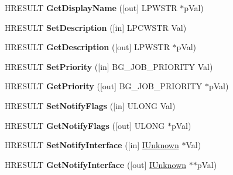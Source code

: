 \begin{DoxyCompactItemize}
H\+R\+E\+S\+U\+LT {\bfseries Get\+Display\+Name} (\mbox{[}out\mbox{]} L\+P\+W\+S\+TR $\ast$p\+Val)
\item 
\mbox{\label{interface_i_background_copy_job_aff86ae5411bd7cec30f2c811a20e73bf}} 
H\+R\+E\+S\+U\+LT {\bfseries Set\+Description} (\mbox{[}in\mbox{]} L\+P\+C\+W\+S\+TR Val)
\item 
\mbox{\label{interface_i_background_copy_job_aa79948c7648f7cd02f9742f31ec1b811}} 
H\+R\+E\+S\+U\+LT {\bfseries Get\+Description} (\mbox{[}out\mbox{]} L\+P\+W\+S\+TR $\ast$p\+Val)
\item 
\mbox{\label{interface_i_background_copy_job_a71f943c5e1dabadc5584926f58f96d3e}} 
H\+R\+E\+S\+U\+LT {\bfseries Set\+Priority} (\mbox{[}in\mbox{]} B\+G\+\_\+\+J\+O\+B\+\_\+\+P\+R\+I\+O\+R\+I\+TY Val)
\item 
\mbox{\label{interface_i_background_copy_job_a1216711ef1b3aa46c85d73c4943e1e49}} 
H\+R\+E\+S\+U\+LT {\bfseries Get\+Priority} (\mbox{[}out\mbox{]} B\+G\+\_\+\+J\+O\+B\+\_\+\+P\+R\+I\+O\+R\+I\+TY $\ast$p\+Val)
\item 
\mbox{\label{interface_i_background_copy_job_a1f634ff9f88d9eeeb2cf8e4dcb16900f}} 
H\+R\+E\+S\+U\+LT {\bfseries Set\+Notify\+Flags} (\mbox{[}in\mbox{]} U\+L\+O\+NG Val)
\item 
\mbox{\label{interface_i_background_copy_job_aab5456a70dd0770a807146c063a6268d}} 
H\+R\+E\+S\+U\+LT {\bfseries Get\+Notify\+Flags} (\mbox{[}out\mbox{]} U\+L\+O\+NG $\ast$p\+Val)
\item 
\mbox{\label{interface_i_background_copy_job_aedc91b7362e956aef58ae0a99a0360e7}} 
H\+R\+E\+S\+U\+LT {\bfseries Set\+Notify\+Interface} (\mbox{[}in\mbox{]} \hyperlink{interface_i_unknown}{I\+Unknown} $\ast$Val)
\item 
\mbox{\label{interface_i_background_copy_job_a6df83212ef83abe7fd77d45353457c4c}} 
H\+R\+E\+S\+U\+LT {\bfseries Get\+Notify\+Interface} (\mbox{[}out\mbox{]} \hyperlink{interface_i_unknown}{I\+Unknown} $\ast$$\ast$p\+Val)
$$
\end{DoxyCompactItemize}
